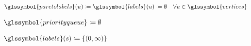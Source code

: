 \begin{algorithm}[tb!]%
\SetAlgoLined
  $\glssymbol{paretolabels}(\vertexa) \coloneqq \glssymbol{labels}(\vertexa)
  \coloneqq
  \emptyset \hspace{1em}\forall\vertexa\in\glssymbol{vertices}$%
  \label{alg:initialization_begin}
  
  $\glssymbol{priorityqueue}\coloneqq\emptyset$\;
  
  $\glssymbol{labels}(\source) \coloneqq \left\{(0, \infty)\right\}$%
  \label{ch:switching:sec:exploit_structural_characteristics:subsec:dtp:alg:shortest_theta_path:line:source_init}


\end{algorithm}
